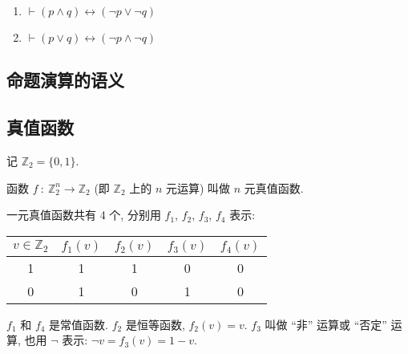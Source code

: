 \documentclass[
    color=black,
    device=normal,
    lang=cn
]{elegantnote}
\begin{document}
\begin{proposition}[De. Morgan 律]
    \begin{enumerate}[label=$\arabic*^\circ$, topsep = -1em]
        \item $\vdash (p\land q)\leftrightarrow (\lnot p\lor \lnot q)$
        \item $\vdash (p\lor q)\leftrightarrow (\lnot p\land \lnot q)$
    \end{enumerate}
\end{proposition}
\subsection{命题演算的语义}
\subsection{真值函数}
记 $\mathbb{Z}_2=\{0,1\}$.
\begin{definition}[真值函数]
    函数 $f\ :\ \mathbb{Z}_2^n\to\mathbb{Z}_2$ (即 $\mathbb{Z}_2$ 上的 $n$ 元运算) 叫做 $n$ 元真值函数.
\end{definition}
\begin{example}[一元真值函数]
    一元真值函数共有 4 个, 分别用 $f_1$, $f_2$, $f_3$, $f_4$ 表示:
    \begin{center}
        \begin{tabular}{c|cccc}
            $v\in\mathbb{Z}_2$ & $f_1(v)$ & $f_2(v)$ & $f_3(v)$ & $f_4(v)$ \\
            \hline
            1                  & 1        & 1        & 0        & 0        \\
            0                  & 1        & 0        & 1        & 0
        \end{tabular}
    \end{center}
    $f_1$ 和 $f_4$ 是常值函数.
    $f_2$ 是恒等函数, $f_2(v)=v$.
    $f_3$ 叫做 ``非'' 运算或 ``否定'' 运算, 也用 $\lnot$ 表示: $\lnot v=f_3(v)=1-v$.
\end{example}
\end{document}

